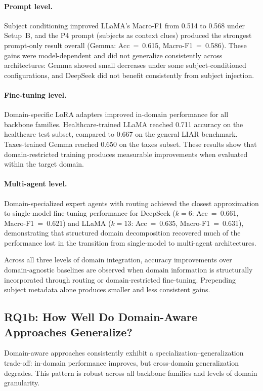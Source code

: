 \paragraph{Prompt level.}
Subject conditioning improved LLaMA's Macro-F1 from 0.514 to 0.568 under Setup~B, and the P4 prompt (subjects as context clues) produced the strongest prompt-only result overall (Gemma: Acc~=~0.615, Macro-F1~=~0.586). These gains were model-dependent and did not generalize consistently across architectures: Gemma showed small decreases under some subject-conditioned configurations, and DeepSeek did not benefit consistently from subject injection.

\paragraph{Fine-tuning level.}
Domain-specific LoRA adapters improved in-domain performance for all backbone families. Healthcare-trained LLaMA reached 0.711 accuracy on the healthcare test subset, compared to 0.667 on the general LIAR benchmark. Taxes-trained Gemma reached 0.650 on the taxes subset. These results show that domain-restricted training produces measurable improvements when evaluated within the target domain.

\paragraph{Multi-agent level.}
Domain-specialized expert agents with routing achieved the closest approximation to single-model fine-tuning performance for DeepSeek ($k{=}6$: Acc~=~0.661, Macro-F1~=~0.621) and LLaMA ($k{=}13$: Acc~=~0.635, Macro-F1~=~0.631), demonstrating that structured domain decomposition recovered much of the performance lost in the transition from single-model to multi-agent architectures.

Across all three levels of domain integration, accuracy improvements over domain-agnostic baselines are observed when domain information is structurally incorporated through routing or domain-restricted fine-tuning. Prepending subject metadata alone produces smaller and less consistent gains.

\subsection{RQ1b: How Well Do Domain-Aware Approaches Generalize?}

Domain-aware approaches consistently exhibit a specialization--generalization trade-off: in-domain performance improves, but cross-domain generalization degrades. This pattern is robust across all backbone families and levels of domain granularity.

